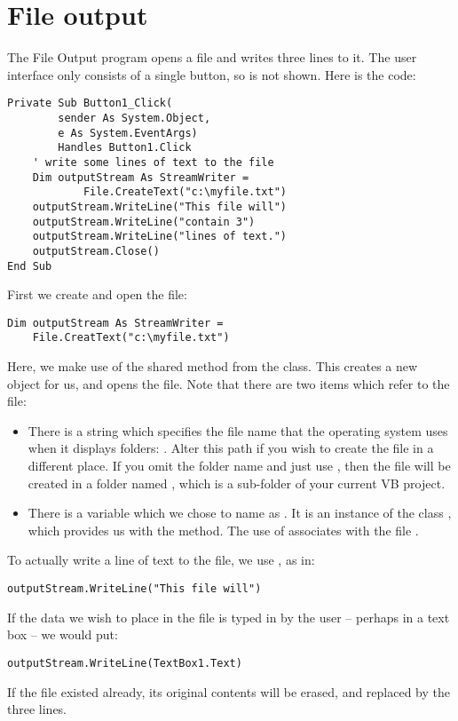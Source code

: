 	\section{File output}
		The File Output program opens a file and writes three lines to it. The user interface only consists of a single button, so is not shown. Here is the code:
		\begin{lstlisting}
Private Sub Button1_Click(
		sender As System.Object,
		e As System.EventArgs)
		Handles Button1.Click
	' write some lines of text to the file
	Dim outputStream As StreamWriter =
			File.CreateText("c:\myfile.txt")
	outputStream.WriteLine("This file will")
	outputStream.WriteLine("contain 3")
	outputStream.WriteLine("lines of text.")
	outputStream.Close()
End Sub
		\end{lstlisting}
		First we create and open the file:
		\begin{lstlisting}
Dim outputStream As StreamWriter =
	File.CreatText("c:\myfile.txt")
		\end{lstlisting}
		Here, we make use of the shared method  from the  class. This creates a new  object for us, and opens the file. Note that there are two items which refer to the file:
		\begin{itemize}
			\item There is a string which specifies the file name that the operating system uses when it displays folders: . Alter this path if you wish to create the file in a different place. If you omit the folder name and just use , then the file will be created in a folder named , which is a sub-folder of your current VB project.
			\item There is a variable which we chose to name as . It is an instance of the class , which provides us with the  method. The use of  associates  with the file .
		\end{itemize}
		To actually write a line of text to the file, we use , as in:
		\begin{lstlisting}
outputStream.WriteLine("This file will")
		\end{lstlisting}
		If the data we wish to place in the file is typed in by the user – perhaps in a text box – we would put:
		\begin{lstlisting}
outputStream.WriteLine(TextBox1.Text)
		\end{lstlisting}
		If the file existed already, its original contents will be erased, and replaced by the three lines.
		

